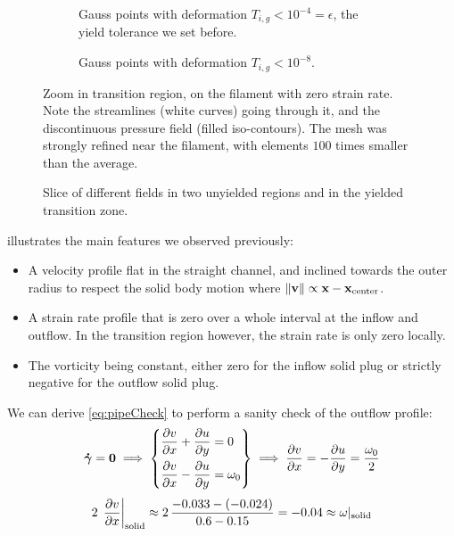 \documentclass[11 pt]{report}
\begin{document}
\begin{figure}[!b]
    \centering
    \begin{subfigure}[t]{\textwidth}
        
        \caption{Gauss points with deformation $T_{i,g} < 10^{-4} = \epsilon$, the yield tolerance we set before.}
        \label{fig:pipeFilament1}
    \end{subfigure}\vspace{10pt}
    \begin{subfigure}[t]{\textwidth}
        
        \caption{Gauss points with deformation $T_{i,g} < 10^{-8}$.}
        \label{fig:pipeFilament2}
    \end{subfigure}
    \caption{Zoom in transition region, on the filament with zero strain rate. Note the streamlines (white curves) going through it, and the discontinuous pressure field (filled iso-contours). The mesh was strongly refined near the filament, with elements $100$ times smaller than the average.}
    \label{fig:pipeFilament}
\end{figure}

\begin{figure}[t]
    \centering
    
    \caption{Slice of different fields in two unyielded regions and in the yielded transition zone.}
    \label{fig:pipeProfiles}
\end{figure}

 illustrates the main features we observed previously:
\begin{itemize}
    \item A velocity profile flat in the straight channel, and inclined towards the outer radius to respect the solid body motion where $\|\mathbf{v}\| \propto \mathbf{x}-\mathbf{x}_{\text{center}}$.
    \item A strain rate profile that is zero over a whole interval at the inflow and outflow. In the transition region however, the strain rate is only zero locally.
    \item The vorticity being constant, either zero for the inflow solid plug or strictly negative for the outflow solid plug.
\end{itemize}

We can derive \cref{eq:pipeCheck} to perform a sanity check of the outflow profile:
\begin{equation}
    \boldsymbol{\dot \gamma}=\mathbf{0} \implies 
    \left\{\begin{aligned}
        &\pdv{v}{x} + \pdv{u}{y} = 0\\
        &\pdv{v}{x} - \pdv{u}{y} = \omega_0\\
    \end{aligned}\right\}
    \implies \pdv{v}{x} = -\pdv{u}{y} = \frac{\omega_0}{2}
    \label{eq:pipeCheck}
\end{equation}
\begin{equation}
    2\,\left.\pdv{v}{x}\right\vert_{\text{solid}} \approx 2\,\frac{-0.033 - (-0.024)}{0.6-0.15} = -0.04 \approx \omega\vert_{\text{solid}}
\end{equation}
\end{document}
